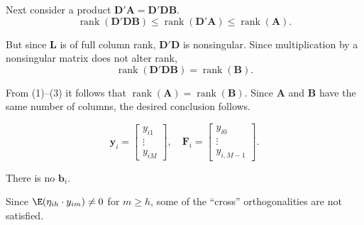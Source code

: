 \begin{answers}
Next consider a product $\mathbf{D}'\mathbf{A} = \mathbf{D}'\mathbf{D}\mathbf{B}$.
\begin{equation}
  \operatorname{rank}(\mathbf{D}'\mathbf{D}\mathbf{B})
  \leq \operatorname{rank}(\mathbf{D}'\mathbf{A})
  \leq \operatorname{rank}(\mathbf{A}). \tag{2}
\end{equation}

But since $\mathbf{L}$ is of full column rank, $\mathbf{D}'\mathbf{D}$ is nonsingular. Since multiplication by
a nonsingular matrix does not alter rank,
\[
  \operatorname{rank}(\mathbf{D}'\mathbf{D}\mathbf{B}) = \operatorname{rank}(\mathbf{B}).
\]

From (1)--(3) it follows that $\operatorname{rank}(\mathbf{A}) = \operatorname{rank}(\mathbf{B})$.
Since $\mathbf{A}$ and $\mathbf{B}$ have the same
number of columns, the desired conclusion follows.

\medskip
{}
\[
  \mathbf{y}_i = \begin{bmatrix} y_{i1} \\ \vdots \\ y_{iM} \end{bmatrix}, \quad
  \mathbf{F}_i = \begin{bmatrix} y_{i0} \\ \vdots \\ y_{i,M-1} \end{bmatrix}.
\]

There is no $\mathbf{b}_i$.

\medskip
{}
Since $\E(\eta_{ih} \cdot y_{im}) \neq 0$ for $m \geq h$, some of the ``cross'' orthogonalities are not
satisfied.
\end{answers}
